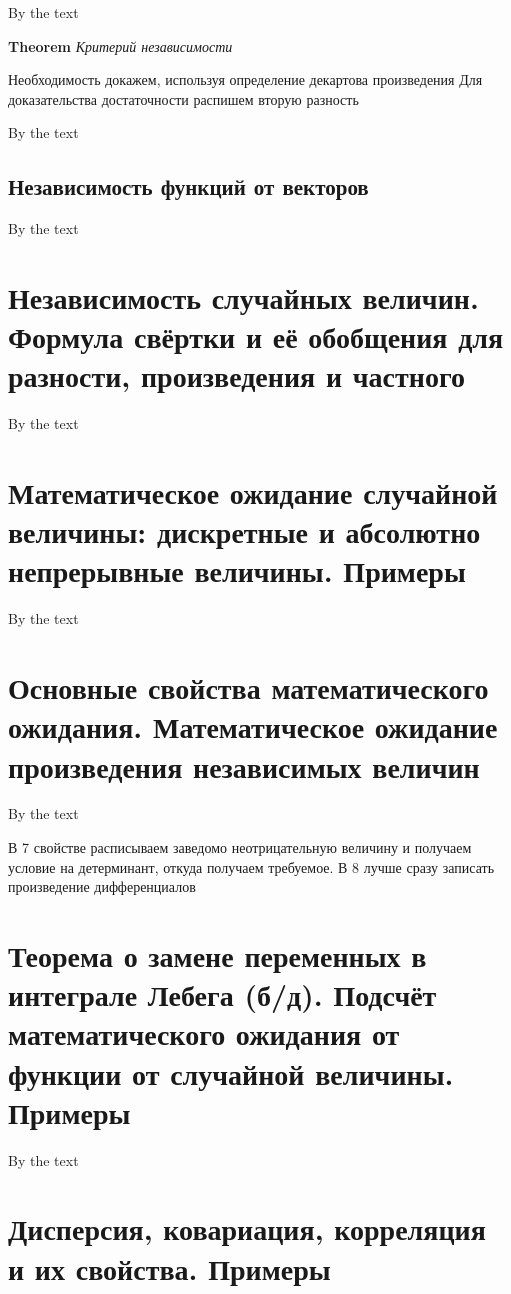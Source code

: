 \documentclass[a4paper, 14pt]{article}
\begin{document}
    By the text
    
    \textbf{Theorem} \textit{Критерий независимости}
    
    Необходимость докажем, используя определение декартова произведения
    Для доказательства достаточности распишем вторую разность
    
    By the text
    
    \subsection{Независимость функций от векторов}
    
    By the text
    
    \section{Независимость случайных величин. Формула свёртки и её обобщения для разности, произведения и частного}
    
    By the text
    
    \section{Математическое ожидание случайной величины: дискретные и абсолютно непрерывные величины.
    Примеры}
    
    By the text
    
    \section{Основные свойства математического ожидания.
    Математическое ожидание произведения независимых величин}
    
    By the text
    
    В 7 свойстве расписываем заведомо неотрицательную величину и получаем условие на детерминант, откуда получаем
    требуемое.
    В 8 лучше сразу записать произведение дифференциалов
    
    \section{Теорема о замене переменных в интеграле Лебега (б/д).
    Подсчёт математического ожидания от функции от случайной величины.
    Примеры}
    
    By the text
    
    \section{Дисперсия, ковариация, корреляция и их свойства.
    Примеры}
    
\end{document}
